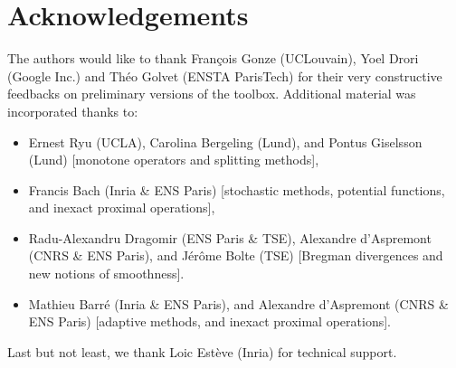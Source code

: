 \documentclass[11pt,a4paper]{article}
\begin{document}
	\section*{Acknowledgements}
	The authors would like to thank Fran\c{c}ois Gonze (UCLouvain), Yoel Drori (Google Inc.) and Th\'eo Golvet (ENSTA ParisTech) for their very constructive feedbacks on preliminary versions of the toolbox.
	Additional material was incorporated thanks to:
	\begin{itemize}
		\item Ernest Ryu (UCLA), Carolina Bergeling (Lund), and Pontus Giselsson (Lund) [monotone operators and splitting methods],
		\item Francis Bach (Inria \& ENS Paris) [stochastic methods, potential functions, and inexact proximal operations],
		\item Radu-Alexandru Dragomir (ENS Paris \& TSE), Alexandre d'Aspremont (CNRS \& ENS Paris), and J\'er\^ome Bolte (TSE) [Bregman divergences and new notions of smoothness].	
		\item Mathieu Barr\'e (Inria \& ENS Paris), and Alexandre d'Aspremont (CNRS \& ENS Paris) [adaptive methods, and inexact proximal operations].
	\end{itemize}
	Last but not least, we thank Loic Est\`eve (Inria) for technical support.
	
\end{document}
